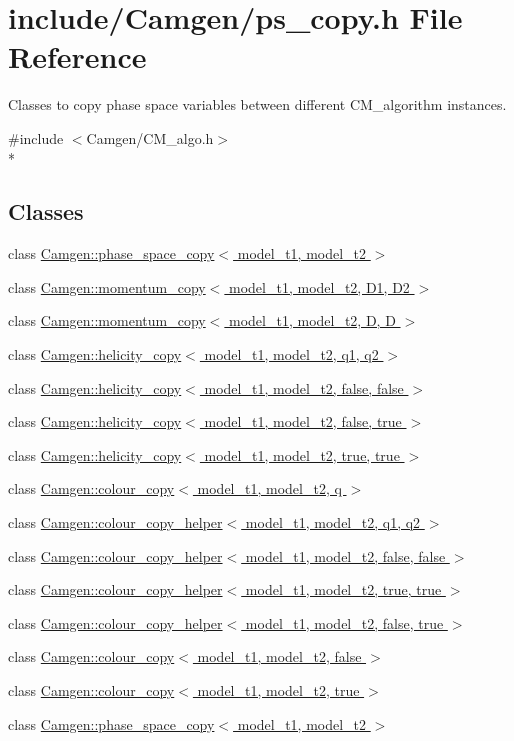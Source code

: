 \hypertarget{a00740}{}\section{include/\+Camgen/ps\+\_\+copy.h File Reference}
\label{a00740}


Classes to copy phase space variables between different C\+M\+\_\+algorithm instances.  


{\ttfamily \#include $<$Camgen/\+C\+M\+\_\+algo.\+h$>$}\\*
\subsection*{Classes}
\begin{DoxyCompactItemize}
\item 
class \hyperlink{a00418}{Camgen\+::phase\+\_\+space\+\_\+copy$<$ model\+\_\+t1, model\+\_\+t2 $>$}
\item 
class \hyperlink{a00377}{Camgen\+::momentum\+\_\+copy$<$ model\+\_\+t1, model\+\_\+t2, D1, D2 $>$}
\item 
class \hyperlink{a00378}{Camgen\+::momentum\+\_\+copy$<$ model\+\_\+t1, model\+\_\+t2, D, D $>$}
\item 
class \hyperlink{a00266}{Camgen\+::helicity\+\_\+copy$<$ model\+\_\+t1, model\+\_\+t2, q1, q2 $>$}
\item 
class \hyperlink{a00267}{Camgen\+::helicity\+\_\+copy$<$ model\+\_\+t1, model\+\_\+t2, false, false $>$}
\item 
class \hyperlink{a00268}{Camgen\+::helicity\+\_\+copy$<$ model\+\_\+t1, model\+\_\+t2, false, true $>$}
\item 
class \hyperlink{a00269}{Camgen\+::helicity\+\_\+copy$<$ model\+\_\+t1, model\+\_\+t2, true, true $>$}
\item 
class \hyperlink{a00066}{Camgen\+::colour\+\_\+copy$<$ model\+\_\+t1, model\+\_\+t2, q $>$}
\item 
class \hyperlink{a00069}{Camgen\+::colour\+\_\+copy\+\_\+helper$<$ model\+\_\+t1, model\+\_\+t2, q1, q2 $>$}
\item 
class \hyperlink{a00070}{Camgen\+::colour\+\_\+copy\+\_\+helper$<$ model\+\_\+t1, model\+\_\+t2, false, false $>$}
\item 
class \hyperlink{a00072}{Camgen\+::colour\+\_\+copy\+\_\+helper$<$ model\+\_\+t1, model\+\_\+t2, true, true $>$}
\item 
class \hyperlink{a00071}{Camgen\+::colour\+\_\+copy\+\_\+helper$<$ model\+\_\+t1, model\+\_\+t2, false, true $>$}
\item 
class \hyperlink{a00067}{Camgen\+::colour\+\_\+copy$<$ model\+\_\+t1, model\+\_\+t2, false $>$}
\item 
class \hyperlink{a00068}{Camgen\+::colour\+\_\+copy$<$ model\+\_\+t1, model\+\_\+t2, true $>$}
\item 
class \hyperlink{a00418}{Camgen\+::phase\+\_\+space\+\_\+copy$<$ model\+\_\+t1, model\+\_\+t2 $>$}
\end{DoxyCompactItemize}
